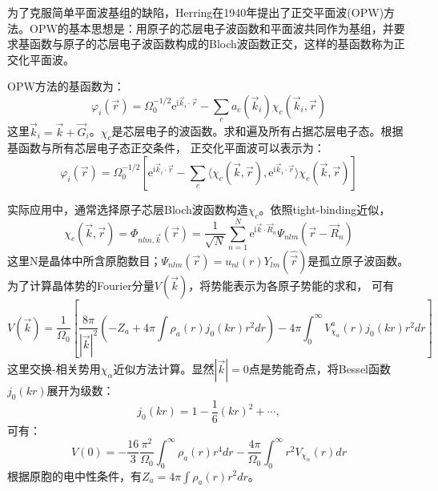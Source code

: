 为了克服简单平面波基组的缺陷，Herring在1940年提出了正交平面波(OPW)方法\cite{PR57-1169_1940}。OPW的基本思想是：用原子的芯层电子波函数和平面波共同作为基组，并要求基函数与原子的芯层电子波函数构成的Bloch波函数正交，这样的基函数称为正交化平面波。

OPW方法的基函数为：
\begin{equation}
	\varphi_i(\vec r)=\Omega_0^{-1/2}\mathrm{e}^{\mathrm{i}\vec k_i\cdot\vec r}-\sum_ca_c(\vec k_i)\chi_c(\vec k_i,\vec r)
  \label{eq:OPW-set}
\end{equation}
这里$\vec k_i=\vec k+\vec G_i$。$\chi_c$是芯层电子的波函数。求和遍及所有占据芯层电子态。根据基函数与所有芯层电子态正交条件，
正交化平面波可以表示为：
\begin{equation}
	\varphi_i(\vec r)=\Omega_0^{-1/2}\left[\mathrm{e}^{\mathrm{i}\vec k_i\cdot\vec r}-\sum_c\langle\chi_c(\vec k,\vec r),\mathrm{e}^{\mathrm{i}\vec k_i\cdot\vec r}\rangle\chi_c(\vec k,\vec r)\right]
  \label{eq:solid-85}
\end{equation}

实际应用中，通常选择原子芯层Bloch波函数构造$\chi_c$。依照tight-binding近似\cite{Huang-Han}，
$$\chi_c(\vec k,\vec r)=\Phi_{nlm,\vec k}(\vec r)=\frac1{\sqrt N}\sum_{n=1}^N\mathrm{e}^{\mathrm{i}\vec k\cdot\vec R_n}\Psi_{nlm}(\vec r-\vec R_n)$$
这里N是晶体中所含原胞数目；$\Psi_{nlm}(\vec r)=u_{nl}(r)Y_{lm}(\hat{\vec r})$是孤立原子波函数。为了计算晶体势的Fourier分量$V(\vec k)$，将势能表示为各原子势能的求和，%
可有\cite{Euwema-Stukel-Collins}
\begin{equation}
  V(\vec k)=\frac1{\Omega_0}\left[\frac{8\pi}{|\vec k|^2}\left(-Z_a+4\pi\int\rho_a(r)j_0(kr)r^2dr\right)-4\pi\int_0^{\infty}V_{\chi_{\alpha}}^a(r)j_0(kr)r^2dr\right]
  \label{eq:solid-87}
\end{equation}
这里交换-相关势用$\chi_\alpha$近似方法计算。显然$|\vec k|=0$点是势能奇点，将Bessel函数$j_0(kr)$展开为级数：
$$j_0(kr)=1-\frac16(kr)^2+\cdots,$$可有：
\begin{equation}
  V(0)=-\frac{16}3\frac{\pi^2}{\Omega_0}\int_0^{\infty}\rho_a(r)r^4dr-\frac{4\pi}{\Omega_0}\int_0^{\infty}r^2V_{\chi_{\alpha}}(r)dr
  \label{eq:solid-88}
\end{equation}
根据原胞的电中性条件，有$Z_a=4\pi\int\rho_a(r)r^2dr$。


